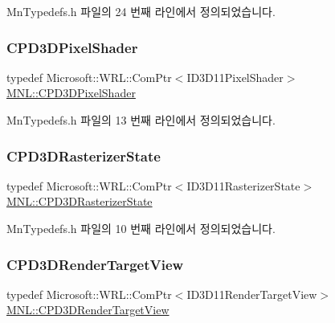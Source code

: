 Mn\+Typedefs.\+h 파일의 24 번째 라인에서 정의되었습니다.

\mbox{\label{namespace_m_n_l_a4d6bd408e6e19137a03728583296f12a}} 
\subsubsection{\texorpdfstring{C\+P\+D3\+D\+Pixel\+Shader}{CPD3DPixelShader}}
{\footnotesize\ttfamily typedef Microsoft\+::\+W\+R\+L\+::\+Com\+Ptr$<$I\+D3\+D11\+Pixel\+Shader$>$ \hyperlink{namespace_m_n_l_a4d6bd408e6e19137a03728583296f12a}{M\+N\+L\+::\+C\+P\+D3\+D\+Pixel\+Shader}}



Mn\+Typedefs.\+h 파일의 13 번째 라인에서 정의되었습니다.

\mbox{\label{namespace_m_n_l_aa6c2682c64c5b58c458c36bb424f1e56}} 
\subsubsection{\texorpdfstring{C\+P\+D3\+D\+Rasterizer\+State}{CPD3DRasterizerState}}
{\footnotesize\ttfamily typedef Microsoft\+::\+W\+R\+L\+::\+Com\+Ptr$<$I\+D3\+D11\+Rasterizer\+State$>$ \hyperlink{namespace_m_n_l_aa6c2682c64c5b58c458c36bb424f1e56}{M\+N\+L\+::\+C\+P\+D3\+D\+Rasterizer\+State}}



Mn\+Typedefs.\+h 파일의 10 번째 라인에서 정의되었습니다.

\mbox{\label{namespace_m_n_l_aa08a7c0b5ac9d877dacb57b9306b7b8c}} 
\subsubsection{\texorpdfstring{C\+P\+D3\+D\+Render\+Target\+View}{CPD3DRenderTargetView}}
{\footnotesize\ttfamily typedef Microsoft\+::\+W\+R\+L\+::\+Com\+Ptr$<$I\+D3\+D11\+Render\+Target\+View$>$ \hyperlink{namespace_m_n_l_aa08a7c0b5ac9d877dacb57b9306b7b8c}{M\+N\+L\+::\+C\+P\+D3\+D\+Render\+Target\+View}}



